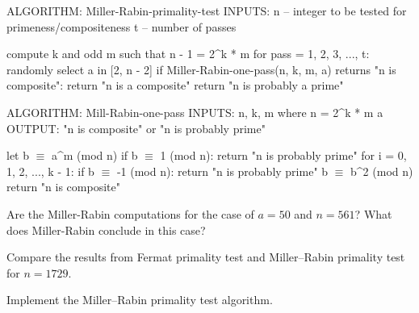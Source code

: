 \newcommand\mathmode[1]{$ #1 $}
\begin{smallconsole}[commandchars=\\\{\}]
ALGORITHM: Miller-Rabin-primality-test
INPUTS: n -- integer to be tested for primeness/compositeness
        t -- number of passes

compute k and odd m such that n - 1 = 2^k * m
for pass = 1, 2, 3, ..., t:
    randomly select a in [2, n - 2]
    if Miller-Rabin-one-pass(n, k, m, a) returns "n is composite":
        return "n is a composite"
return "n is probably a prime"


ALGORITHM: Mill-Rabin-one-pass
INPUTS: n, k, m where n = 2^k * m
        a
OUTPUT: "n is composite" or "n is probably prime"
       
let b \mathmode{\equiv} a^m (mod n)
if b \mathmode{\equiv} 1 (mod n):
    return "n is probably prime"
for i = 0, 1, 2, ..., k - 1:
    if b \mathmode{\equiv} -1 (mod n):
        return "n is probably prime"
    b \mathmode{\equiv} b^2 (mod n)
return "n is composite"
\end{smallconsole}

\begin{ex}
  Are the Miller-Rabin computations for the case of $a = 50$ and $n = 561$?
  What does Miller-Rabin conclude in this case?
\end{ex}

\begin{ex}
  Compare the results from Fermat primality test and Miller--Rabin
  primality test for $n = 1729$.
\end{ex}

\begin{ex}
  Implement the Miller--Rabin primality test algorithm.
\end{ex}


